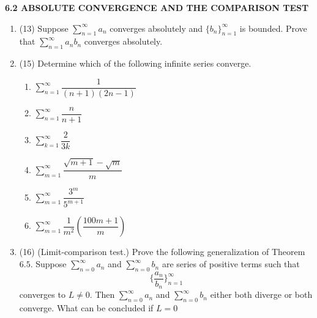\documentclass[fleqn]{article}
\begin{document}
  \textbf{6.2 ABSOLUTE CONVERGENCE AND THE COMPARISON TEST}
  \begin{enumerate}
    \item (13) Suppose $\sum\limits_{n=1}^{\infty} a_n$ converges absolutely and $\{ b_n \}_{n=1}^{\infty}$ is bounded.
    Prove that $\sum\limits_{n=1}^{\infty} a_n b_n$ converges absolutely.

          

    \item (15) Determine which of the following infinite series converge.
    \begin{enumerate}
      \item $\sum\limits_{n=1}^{\infty} \dfrac{1}{(n+1)(2n-1)}$

          

      \item $\sum\limits_{n=1}^{\infty} \dfrac{n}{n+1}$

          

      \item $\sum\limits_{k=1}^{\infty} \dfrac{2}{3k}$
      
          

      \item $\sum\limits_{m=1}^{\infty} \dfrac{\sqrt{m+1}-\sqrt{m}}{m}$

          

      \item $\sum\limits_{m=1}^{\infty} \dfrac{3^m}{5^{m+1}}$

          

      \item $\sum\limits_{m=1}^{\infty} \dfrac{1}{m^2} \left(\dfrac{100m+1}{m}\right)$

          

    \end{enumerate}

    \item (16) (Limit-comparison test.) Prove the following generalization of Theorem $6.5$. Suppose
    $\sum\limits_{n=0}^{\infty} a_n$ and $\sum\limits_{n=0}^{\infty} b_n$ are series of positive terms such that 
    $$\{ \dfrac{a_n}{b_n} \}_{n=1}^{\infty}$$
    converges to $L\neq 0$. Then $\sum\limits_{n=0}^{\infty} a_n$ and $\sum\limits_{n=0}^{\infty} b_n$  either both diverge or both converge.
    What can be concluded if $L=0$

          
 
  \end{enumerate}
\end{document}
